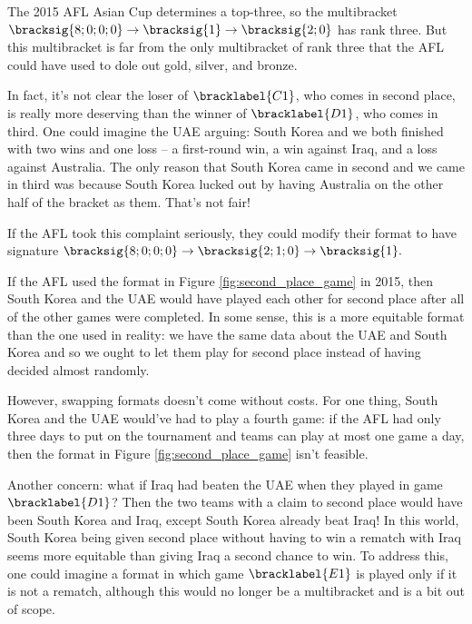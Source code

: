 {    The 2015 AFL Asian Cup determines a top-three, so the multibracket $\bracksig{8;0;0;0} \to \bracksig{1} \to \bracksig{2;0}$ has rank three. But this multibracket is far from the only multibracket of rank three that the AFL could have used to dole out gold, silver, and bronze.
    
    In fact, it's not clear the loser of $\bracklabel{C1}$, who comes in second place, is really more deserving than the winner of $\bracklabel{D1}$, who comes in third. One could imagine the UAE arguing: South Korea and we both finished with two wins and one loss -- a first-round win, a win against Iraq, and a loss against Australia. The only reason that South Korea came in second and we came in third was because South Korea lucked out by having Australia on the other half of the bracket as them. That's not fair!

    If the AFL took this complaint seriously, they could modify their format to have signature $\bracksig{8;0;0;0} \to \bracksig{2; 1; 0} \to \bracksig{1}.$
    

    If the AFL used the format in Figure \ref{fig:second_place_game} in 2015, then South Korea and the UAE would have played each other for second place after all of the other games were completed. In some sense, this is a more equitable format than the one used in reality: we have the same data about the UAE and South Korea and so we ought to let them play for second place instead of having decided almost randomly.

    However, swapping formats doesn't come without costs. For one thing, South Korea and the UAE would've had to play a fourth game: if the AFL had only three days to put on the tournament and teams can play at most one game a day, then the format in Figure \ref{fig:second_place_game} isn't feasible.

    Another concern: what if Iraq had beaten the UAE when they played in game $\bracklabel{D1}$? Then the two teams with a claim to second place would have been South Korea and Iraq, except South Korea already beat Iraq! In this world, South Korea being given second place without having to win a rematch with Iraq seems more equitable than giving Iraq a second chance to win. To address this, one could imagine a format in which game $\bracklabel{E1}$ is played only if it is not a rematch, although this would no longer be a multibracket and is a bit out of scope.

}
